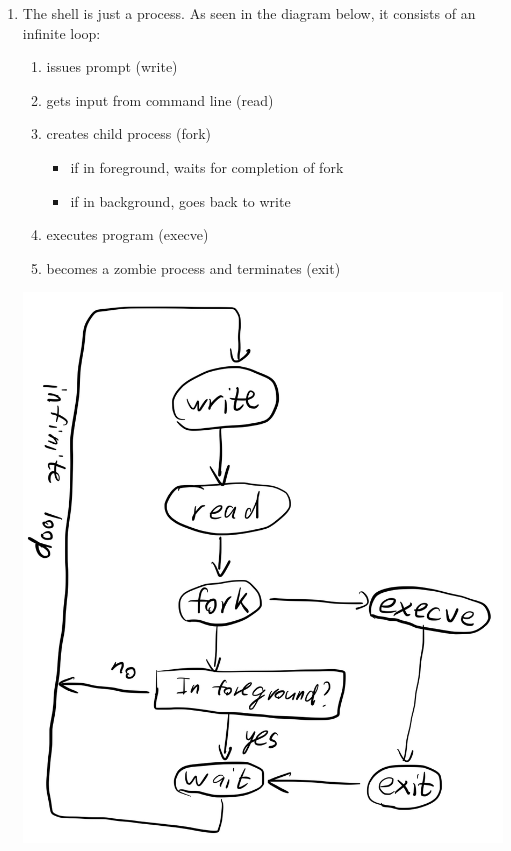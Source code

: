 \documentclass[12pt]{article}
\begin{document}
\begin{enumerate}
    \item The shell is just a process. As seen in the diagram below, it consists of an infinite loop:
    \begin{enumerate}[1.]
        \item issues prompt (write)
        \item gets input from command line (read)
        \item creates child process (fork)
        \begin{itemize}
            \item if in foreground, waits for completion of fork
            \item if in background, goes back to write
        \end{itemize}
        \item executes program (execve)
        \item becomes a zombie process and terminates (exit)
    \end{enumerate}
    \includegraphics[scale=0.2]{6.jpg}
\end{enumerate}
\end{document}
